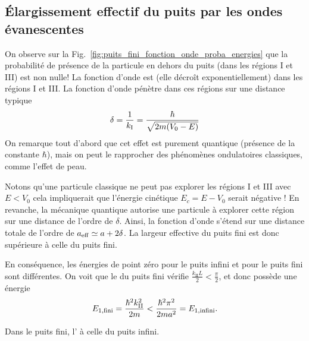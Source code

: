 \documentclass[12pt,fancy]{cours}
\begin{document}
 \subsection{Élargissement effectif du puits par les ondes évanescentes}
On observe sur la Fig.~\ref{fig:puits_fini_fonction_onde_proba_energies} que la probabilité de présence de la particule en dehors du puits (dans les régions I et III) est non nulle! La fonction d'onde est  (elle décroît exponentiellement) dans les régions I et III. La fonction d'onde pénètre dans ces régions sur une distance typique
\begin{equation}
\delta=\frac{1}{k_{\rm{I}}}=\frac{\hbar}{\sqrt{2m(V_0-E)}}
\end{equation}
On remarque tout d'abord que cet effet est purement quantique (présence de la constante $\hbar$), mais on peut le rapprocher des phénomènes ondulatoires classiques, comme l'effet de peau.

Notons qu'une particule classique ne peut pas explorer les régions I et III avec $E<V_0$ cela impliquerait que l'énergie cinétique $E_c = E-V_0$ serait négative ! En revanche, la mécanique quantique autorise une particule à explorer cette région sur une distance de l'ordre de $\delta$. Ainsi, la fonction d'onde s'étend sur une distance totale de l'ordre de $a_{\rm eff} \simeq a+2\delta$. La largeur effective du puits fini est donc supérieure à celle du puits fini.

En conséquence, les énergies de point zéro pour le puits infini et pour le puits fini sont différentes. On voit que le  du puits fini vérifie $\frac{k_\mathrm{II}L}{2}<\frac{\pi}{2}$, et donc possède une énergie
\begin{equation}
  E_{1,{\rm fini}} = \frac{\hbar^2 k_{\rm{II}}^2}{2m} < \frac{\hbar^2\pi^2}{2ma^2} =   E_{1,{\rm infini}} .
\end{equation}
\begin{prop}\label{prop:}
  Dans le puits fini, l' à celle du puits infini.
\end{prop}
\end{document}
